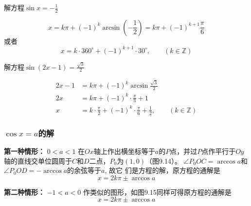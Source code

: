 \begin{example}
    解方程$\sin x=-\frac{1}{2} $
\end{example}

\begin{solution}
\[x=k\pi+(-1)^k\arcsin\left(-\frac{1}{2}\right)=k\pi+(-1)^{k+1}\frac{\pi}{6}\]
    或者\[x=k\cdot 360^{\circ}+(-1)^{k+1}\cdot  30^{\circ},\qquad (k\in\mathbb{Z})\]
\end{solution}


\begin{example}
    解方程$\sin (2x-1)=\frac{\sqrt{3}}{2} $
\end{example}

\begin{solution}
\[\begin{split}
   2x-1&=k\pi+(-1)^k \arcsin\frac{\sqrt{3}}{2}\\ 
2x&=k\pi+(-1)^k \cdot \frac{\pi}{3}+1\\
  x &=k\cdot\frac{\pi}{2}+(-1)^k\cdot \frac{\pi}{6}+\frac{1}{2} ,\qquad (k\in\mathbb{Z})
 \end{split}\]   
\end{solution}

\subsubsection{$\cos x=a$的解}

\textbf{第一种情形：} $0<a<1$
在$Ox$轴上作出横坐标等于$a$的$P$点，并过$P$点作平行于$Oy$
轴的直线交单位圆周于$C$和$D$二点，$P_0$为$(1,0)$（图9.14）。
$\angle P_0OC=\arccos a$和$\angle P_0OD=-\arccos a$的余弦等于$a$, 故它
们是方程的解，原方程的通解是
\[x=2k\pi\pm \arccos a\]

\textbf{第二种情形：} $-1<a<0$
作类似的图形，如图9.15同样可得原方程的通解是
\[x=2k\pi\pm \arccos a\]


